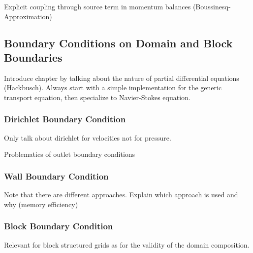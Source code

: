        Explicit coupling through source term in momentum balances (Boussinesq-Approximation)

    \subsection{Boundary Conditions on Domain and Block Boundaries}

        Introduce chapter by talking about the nature of partial differential equations (Hackbusch). Always start with a simple implementation for the generic transport equation, then specialize to Navier-Stokes equation.

      \subsubsection{Dirichlet Boundary Condition}

        Only talk about dirichlet for velocities not for pressure.


        Problematics of outlet boundary conditions


      \subsubsection{Wall Boundary Condition}

      Note that there are different approaches. Explain which approach is used and why (memory efficiency)

      \subsubsection{Block Boundary Condition}

      Relevant for block structured grids as for the validity of the domain composition.
      
